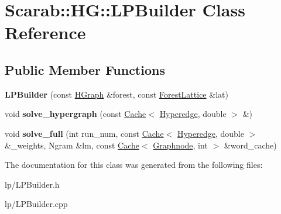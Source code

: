 \hypertarget{class_scarab_1_1_h_g_1_1_l_p_builder}{
\section{Scarab::HG::LPBuilder Class Reference}
\label{class_scarab_1_1_h_g_1_1_l_p_builder}
}
\subsection*{Public Member Functions}
\begin{DoxyCompactItemize}
\item 
\hypertarget{class_scarab_1_1_h_g_1_1_l_p_builder_aba798e4d3faf87e8411607f9d974fc7f}{
{\bfseries LPBuilder} (const \hyperlink{class_scarab_1_1_h_g_1_1_h_graph}{HGraph} \&forest, const \hyperlink{class_forest_lattice}{ForestLattice} \&lat)}
\label{class_scarab_1_1_h_g_1_1_l_p_builder_aba798e4d3faf87e8411607f9d974fc7f}

\item 
\hypertarget{class_scarab_1_1_h_g_1_1_l_p_builder_abfa755f4c94dc432c022be35861a8200}{
void {\bfseries solve\_\-hypergraph} (const \hyperlink{class_cache}{Cache}$<$ \hyperlink{class_scarab_1_1_h_g_1_1_hyperedge}{Hyperedge}, double $>$ \&)}
\label{class_scarab_1_1_h_g_1_1_l_p_builder_abfa755f4c94dc432c022be35861a8200}

\item 
\hypertarget{class_scarab_1_1_h_g_1_1_l_p_builder_a963bdf9c956b4a08d52be06e1cb6a05a}{
void {\bfseries solve\_\-full} (int run\_\-num, const \hyperlink{class_cache}{Cache}$<$ \hyperlink{class_scarab_1_1_h_g_1_1_hyperedge}{Hyperedge}, double $>$ \&\_\-weights, Ngram \&lm, const \hyperlink{class_cache}{Cache}$<$ \hyperlink{class_scarab_1_1_graph_1_1_graphnode}{Graphnode}, int $>$ \&word\_\-cache)}
\label{class_scarab_1_1_h_g_1_1_l_p_builder_a963bdf9c956b4a08d52be06e1cb6a05a}

\end{DoxyCompactItemize}


The documentation for this class was generated from the following files:\begin{DoxyCompactItemize}
\item 
lp/LPBuilder.h\item 
lp/LPBuilder.cpp\end{DoxyCompactItemize}
